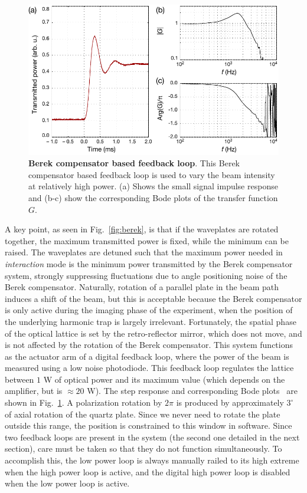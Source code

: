 \documentclass[twocolumn,aps,pra,showpacs,preprintnumbers,bibnotes]{revtex4-1}
\begin{document}
\begin{figure}
  \begin{center}
    \includegraphics[width=\columnwidth]{Figure5.pdf}
    \caption{\textbf{Berek compensator based feedback loop}. This Berek compensator based feedback loop is used to vary the beam intensity at relatively high power. (a) Shows the small signal impulse response and (b-c) show the corresponding Bode plots of the transfer function $G$.}\label{fig:berek_step_response}
  \end{center}
\end{figure}
A key point, as seen in Fig.~\ref{fig:berek}, is that if the waveplates are rotated together, the maximum transmitted power is fixed, while the minimum can be raised.
The waveplates are detuned such that the maximum power needed in \textit{interaction} mode is the minimum power transmitted by the Berek compensator system, strongly suppressing fluctuations due to angle positioning noise of the Berek compensator.
Naturally, rotation of a parallel plate in the beam path induces a shift of the beam, but this is acceptable because the Berek compensator is only active during the imaging phase of the experiment, when the position of the underlying harmonic trap is largely irrelevant.
Fortunately, the spatial phase of the optical lattice is set by the retro-reflector mirror, which does not move, and is not affected by the rotation of the Berek compensator.
This system functions as the actuator arm of a digital feedback loop, where the power of the beam is measured using a low noise photodiode. This feedback loop regulates the lattice between $1$ W of optical power and its maximum value (which depends on the amplifier, but is $\approx20$ W).
The step response and corresponding Bode plots~\cite{Bechhoefer2005} are shown in Fig.~\ref{fig:berek_step_response}.
A polarization rotation by $2 \pi$ is produced by approximately $3^\circ$ of axial rotation of the quartz plate.
Since we never need to rotate the plate outside this range, the position is constrained to this window in software.
Since two feedback loops are present in the system (the second one detailed in the next section), care must be taken so that they do not function simultaneously.
To accomplish this, the low power loop is always manually railed to its high extreme when the high power loop is active, and the digital high power loop is disabled when the low power loop is active.
\end{document}
